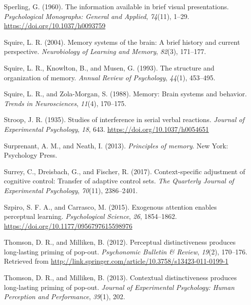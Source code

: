 \documentclass[]{DissertateCUNY}
\begin{document}
\leavevmode\hypertarget{ref-sperling_information_1960}{}%
Sperling, G. (1960). The information available in brief visual
presentations. \emph{Psychological Monographs: General and Applied},
\emph{74}(11), 1--29. \url{https://doi.org/10.1037/h0093759}

\leavevmode\hypertarget{ref-squire_memory_2004}{}%
Squire, L. R. (2004). Memory systems of the brain: A brief history and
current perspective. \emph{Neurobiology of Learning and Memory},
\emph{82}(3), 171--177.

\leavevmode\hypertarget{ref-squire_structure_1993}{}%
Squire, L. R., Knowlton, B., and Musen, G. (1993). The structure and
organization of memory. \emph{Annual Review of Psychology},
\emph{44}(1), 453--495.

\leavevmode\hypertarget{ref-squire_memory_1988}{}%
Squire, L. R., and Zola-Morgan, S. (1988). Memory: Brain systems and
behavior. \emph{Trends in Neurosciences}, \emph{11}(4), 170--175.

\leavevmode\hypertarget{ref-stroop_studies_1935}{}%
Stroop, J. R. (1935). Studies of interference in serial verbal
reactions. \emph{Journal of Experimental Psychology}, \emph{18}, 643.
\url{https://doi.org/10.1037/h0054651}

\leavevmode\hypertarget{ref-surprenant_principles_2013}{}%
Surprenant, A. M., and Neath, I. (2013). \emph{Principles of memory}.
New York: Psychology Press.

\leavevmode\hypertarget{ref-surrey_context-specific_2017}{}%
Surrey, C., Dreisbach, G., and Fischer, R. (2017). Context-specific
adjustment of cognitive control: Transfer of adaptive control sets.
\emph{The Quarterly Journal of Experimental Psychology}, \emph{70}(11),
2386--2401.

\leavevmode\hypertarget{ref-szpiro_exogenous_2015}{}%
Szpiro, S. F. A., and Carrasco, M. (2015). Exogenous attention enables
perceptual learning. \emph{Psychological Science}, \emph{26},
1854--1862. \url{https://doi.org/10.1177/0956797615598976}

\leavevmode\hypertarget{ref-thomson_perceptual_2012}{}%
Thomson, D. R., and Milliken, B. (2012). Perceptual distinctiveness
produces long-lasting priming of pop-out. \emph{Psychonomic Bulletin \&
Review}, \emph{19}(2), 170--176. Retrieved from
\url{http://link.springer.com/article/10.3758/s13423-011-0199-1}

\leavevmode\hypertarget{ref-thomson_contextual_2013}{}%
Thomson, D. R., and Milliken, B. (2013). Contextual distinctiveness
produces long-lasting priming of pop-out. \emph{Journal of Experimental
Psychology: Human Perception and Performance}, \emph{39}(1), 202.
\end{document}
